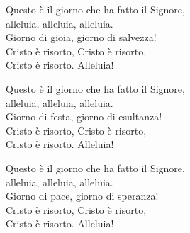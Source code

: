 
\strofa Questo è il giorno che ha fatto il Signore,\\
alleluia, alleluia, alleluia.\\
Giorno di gioia, giorno di salvezza!\\
Cristo è risorto, Cristo è risorto,\\
Cristo è risorto. Alleluia!

\spazio

\strofa Questo è il giorno che ha fatto il Signore,\\
alleluia, alleluia, alleluia.\\
Giorno di festa, giorno di esultanza!\\
Cristo è risorto, Cristo è risorto,\\
Cristo è risorto. Alleluia!

\spazio

\strofa Questo è il giorno che ha fatto il Signore,\\
alleluia, alleluia, alleluia.\\
Giorno di pace, giorno di speranza!\\
Cristo è risorto, Cristo è risorto,\\
Cristo è risorto. Alleluia!
